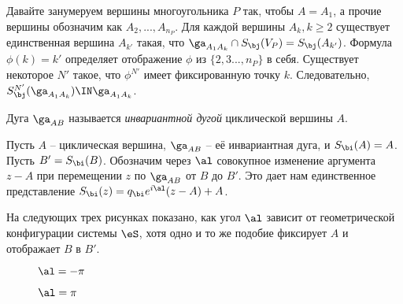 Давайте занумеруем вершины многоугольника $P$ так, чтобы $A=A_1$, а прочие вершины обозначим как $A_2,...,A_{n_P}$. Для каждой вершины $A_k, k\ge 2$ существует единственная вершина $A_{k'}$ такая, что $\ga_{A_1A_k}\cap S_\bj(V_P)=S_\bj(A_{k'})$. Формула $\phi(k)=k'$ определяет отображение $\phi$ из $\{2,3...,n_P\}$ в себя. Существует некоторое $N'$ такое, что $\phi^{N'}$  имеет фиксированную точку $k$. Следовательно, $S_\bj^{N'}(\ga_{A_1A_k})\IN \ga_{A_1A_k}$.
\vse

\begin{definition} 
Дуга $\ga_{AB}$ называется {\em инвариантной дугой} циклической вершины $A$.\\
\end{definition}

Пусть $A$ -- циклическая вершина, $\ga_{AB}$ -- её инвариантная дуга, и $S_\bi(A)=A$. Пусть $B'=S_\bi(B)$. Обозначим через $\al$ совокупное изменение аргумента $z-A$ при перемещении $z$ по $\ga_{AB}$ от $B$ до $B'$. Это дает нам единственное представление  $S_\bi(z)=q_\bi e^{i\al}(z-A)+A$. 

\begin{rmk} 
На следующих трех рисунках показано, как угол $\al$ зависит от геометрической конфигурации системы $\eS$, хотя одно и то же подобие фиксирует $A$ и отображает $B$ в $B'$.
\end{rmk}


\begin{figure}[h!]
\centering
{}
\caption{$\al=-\pi$}%
\label{cntrex}%
\end{figure}

\newpage

\begin{figure}[h!]
\centering
{}
\caption{$\al=\pi$}%
\label{cntrex}%
\end{figure}

